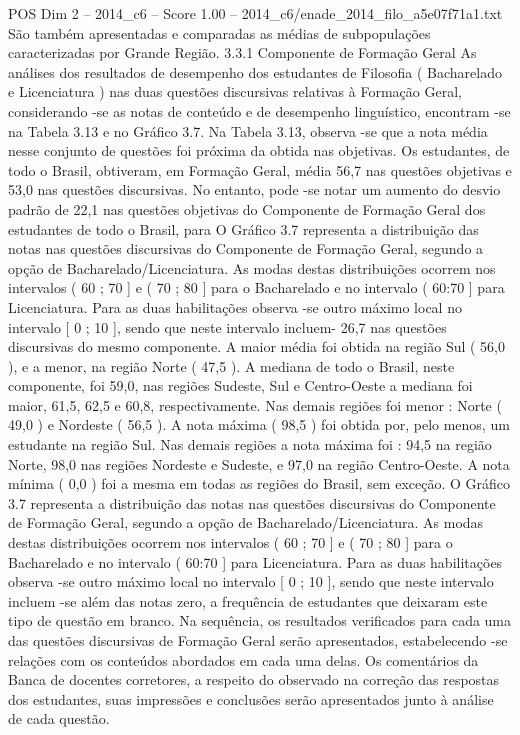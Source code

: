 \begin{textsample}{POS Dim 2 – 2014\_c6 – Score 1.00 – 2014\_c6/enade\_2014\_filo\_a5e07f71a1.txt}
São também apresentadas e comparadas as médias de subpopulações caracterizadas por Grande Região. 3.3.1 Componente de Formação Geral As análises dos resultados de desempenho dos estudantes de Filosofia ( Bacharelado e Licenciatura ) nas duas questões discursivas relativas à Formação Geral, considerando -se as notas de conteúdo e de desempenho linguístico, encontram -se na Tabela 3.13 e no Gráfico 3.7.
Na Tabela 3.13, observa -se que a nota média nesse conjunto de questões foi próxima da obtida nas objetivas.
Os estudantes, de todo o Brasil, obtiveram, em Formação Geral, média 56,7 nas questões objetivas e 53,0 nas questões discursivas.
No entanto, pode -se notar um aumento do desvio padrão de 22,1 nas questões objetivas do Componente de Formação Geral dos estudantes de todo o Brasil, para O Gráfico 3.7 representa a distribuição das notas nas questões discursivas do Componente de Formação Geral, segundo a opção de Bacharelado/Licenciatura.
As modas destas distribuições ocorrem nos intervalos ( 60 ; 70 ] e ( 70 ; 80 ] para o Bacharelado e no intervalo ( 60:70 ] para Licenciatura.
Para as duas habilitações observa -se outro máximo local no intervalo [ 0 ; 10 ], sendo que neste intervalo incluem- 26,7 nas questões discursivas do mesmo componente.
A maior média foi obtida na região Sul ( 56,0 ), e a menor, na região Norte ( 47,5 ).
A mediana de todo o Brasil, neste componente, foi 59,0, nas regiões Sudeste, Sul e Centro-Oeste a mediana foi maior, 61,5, 62,5 e 60,8, respectivamente.
Nas demais regiões foi menor : Norte ( 49,0 ) e Nordeste ( 56,5 ).
A nota máxima ( 98,5 ) foi obtida por, pelo menos, um estudante na região Sul.
Nas demais regiões a nota máxima foi : 94,5 na região Norte, 98,0 nas regiões Nordeste e Sudeste, e 97,0 na região Centro-Oeste.
A nota mínima ( 0,0 ) foi a mesma em todas as regiões do Brasil, sem exceção.
O Gráfico 3.7 representa a distribuição das notas nas questões discursivas do Componente de Formação Geral, segundo a opção de Bacharelado/Licenciatura.
As modas destas distribuições ocorrem nos intervalos ( 60 ; 70 ] e ( 70 ; 80 ] para o Bacharelado e no intervalo ( 60:70 ] para Licenciatura.
Para as duas habilitações observa -se outro máximo local no intervalo [ 0 ; 10 ], sendo que neste intervalo incluem -se além das notas zero, a frequência de estudantes que deixaram este tipo de questão em branco.
Na sequência, os resultados verificados para cada uma das questões discursivas de Formação Geral serão apresentados, estabelecendo -se relações com os conteúdos abordados em cada uma delas.
Os comentários da Banca de docentes corretores, a respeito do observado na correção das respostas dos estudantes, suas impressões e conclusões serão apresentados junto à análise de cada questão.

\end{textsample}
